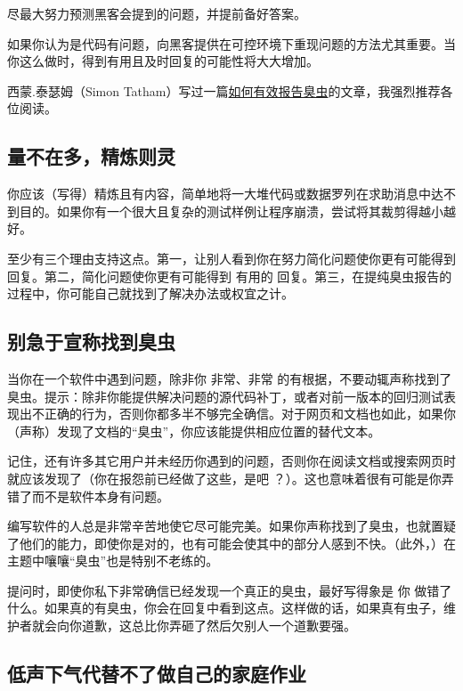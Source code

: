 尽最大努力预测黑客会提到的问题，并提前备好答案。

如果你认为是代码有问题，向黑客提供在可控环境下重现问题的方法尤其重要。当你这么做时，得到有用且及时回复的可能性将大大增加。

西蒙.泰瑟姆（Simon Tatham）写过一篇\href{http://www.chiark.greenend.org.uk/~sgtatham/bugs.html}{如何有效报告臭虫}的文章，我强烈推荐各位阅读。



\subsection{量不在多，精炼则灵}
\label{not_much}

你应该（写得）精炼且有内容，简单地将一大堆代码或数据罗列在求助消息中达不到目的。如果你有一个很大且复杂的测试样例让程序崩溃，尝试将其裁剪得越小越好。

至少有三个理由支持这点。第一，让别人看到你在努力简化问题使你更有可能得到回复。第二，简化问题使你更有可能得到 有用的 回复。第三，在提纯臭虫报告的过程中，你可能自己就找到了解决办法或权宜之计。


\subsection{别急于宣称找到臭虫}


当你在一个软件中遇到问题，除非你 非常、非常 的有根据，不要动辄声称找到了臭虫。提示：除非你能提供解决问题的源代码补丁，或者对前一版本的回归测试表现出不正确的行为，否则你都多半不够完全确信。对于网页和文档也如此，如果你（声称）发现了文档的“臭虫”，你应该能提供相应位置的替代文本。

记住，还有许多其它用户并未经历你遇到的问题，否则你在阅读文档或搜索网页时就应该发现了（你在报怨前已经做了这些，是吧 ？）。这也意味着很有可能是你弄错了而不是软件本身有问题。

编写软件的人总是非常辛苦地使它尽可能完美。如果你声称找到了臭虫，也就置疑了他们的能力，即使你是对的，也有可能会使其中的部分人感到不快。（此外，）在主题中嚷嚷“臭虫”也是特别不老练的。

提问时，即使你私下非常确信已经发现一个真正的臭虫，最好写得象是 你 做错了什么。如果真的有臭虫，你会在回复中看到这点。这样做的话，如果真有虫子，维护者就会向你道歉，这总比你弄砸了然后欠别人一个道歉要强。





\subsection{低声下气代替不了做自己的家庭作业}


